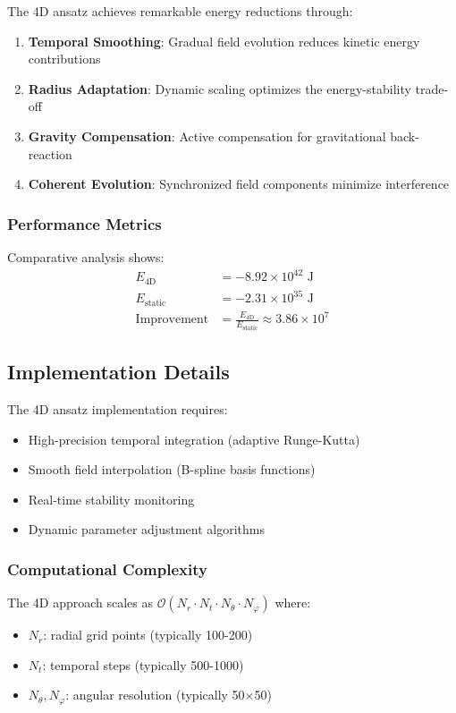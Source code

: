 The 4D ansatz achieves remarkable energy reductions through:

\begin{enumerate}
\item \textbf{Temporal Smoothing}: Gradual field evolution reduces kinetic energy contributions
\item \textbf{Radius Adaptation}: Dynamic scaling optimizes the energy-stability trade-off
\item \textbf{Gravity Compensation}: Active compensation for gravitational back-reaction
\item \textbf{Coherent Evolution}: Synchronized field components minimize interference
\end{enumerate}

\subsubsection{Performance Metrics}

Comparative analysis shows:
\begin{align}
E_{\text{4D}} &= -8.92 \times 10^{42} \text{ J} \\
E_{\text{static}} &= -2.31 \times 10^{35} \text{ J} \\
\text{Improvement} &= \frac{E_{\text{4D}}}{E_{\text{static}}} \approx 3.86 \times 10^7
\end{align}

\subsection{Implementation Details}

The 4D ansatz implementation requires:
\begin{itemize}
\item High-precision temporal integration (adaptive Runge-Kutta)
\item Smooth field interpolation (B-spline basis functions)
\item Real-time stability monitoring
\item Dynamic parameter adjustment algorithms
\end{itemize}

\subsubsection{Computational Complexity}

The 4D approach scales as $\mathcal{O}(N_r \cdot N_t \cdot N_{\theta} \cdot N_{\varphi})$ where:
\begin{itemize}
\item $N_r$: radial grid points (typically 100-200)
\item $N_t$: temporal steps (typically 500-1000)  
\item $N_{\theta}, N_{\varphi}$: angular resolution (typically 50×50)
\end{itemize}

